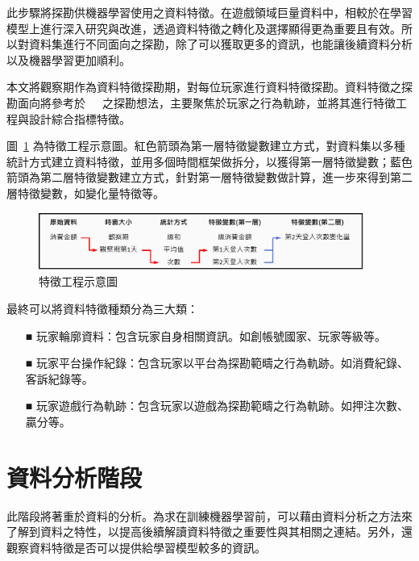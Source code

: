 此步驟將探勘供機器學習使用之資料特徵。在遊戲領域巨量資料中，相較於在學習模型上進行深入研究與改進，透過資料特徵之轉化及選擇顯得更為重要且有效。所以對資料集進行不同面向之探勘，除了可以獲取更多的資訊，也能讓後續資料分析以及機器學習更加順利。

本文將觀察期作為資料特徵探勘期，對每位玩家進行資料特徵探勘。資料特徵之探勘面向將參考於~\cite{sifa2015predicting}~\cite{lee2016predicting}~\cite{martinez2020machine}之探勘想法，主要聚焦於玩家之行為軌跡，並將其進行特徵工程與設計綜合指標特徵。

圖~\ref{fig:Image_FeatureEngineering} 為特徵工程示意圖。紅色箭頭為第一層特徵變數建立方式，對資料集以多種統計方式建立資料特徵，並用多個時間框架做拆分，以獲得第一層特徵變數；藍色箭頭為第二層特徵變數建立方式，針對第一層特徵變數做計算，進一步來得到第二層特徵變數，如變化量特徵等。

\begin{figure}[!htb]
  \begin{center}
    \includegraphics[width=0.95\textwidth]{figures/Image_FeatureEngineering.png}
    \caption[特徵工程示意圖]{特徵工程示意圖}
    \label{fig:Image_FeatureEngineering}
  \end{center}
\end{figure}
\newpage

最終可以將資料特徵種類分為三大類：

\begin{itemize}
  \item[■] 玩家輪廓資料：包含玩家自身相關資訊。如創帳號國家、玩家等級等。
  \item[■] 玩家平台操作紀錄：包含玩家以平台為探勘範疇之行為軌跡。如消費紀錄、客訴紀錄等。
  \item[■] 玩家遊戲行為軌跡：包含玩家以遊戲為探勘範疇之行為軌跡。如押注次數、贏分等。
\end{itemize}

\section{資料分析階段}

此階段將著重於資料的分析。為求在訓練機器學習前，可以藉由資料分析之方法來了解到資料之特性，以提高後續解讀資料特徵之重要性與其相關之連結。另外，還觀察資料特徵是否可以提供給學習模型較多的資訊。

